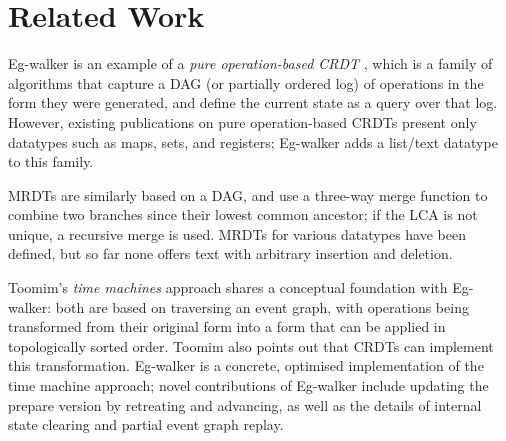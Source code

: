\documentclass[sigplan,10pt]{acmart}
\newcommand{\algname}{Eg-walker\xspace}
\begin{document}



\section{Related Work}\label{related-work}

\algname is an example of a \emph{pure operation-based CRDT} \cite{polog}, which is a family of algorithms that capture a DAG (or partially ordered log) of operations in the form they were generated, and define the current state as a query over that log.
However, existing publications on pure operation-based CRDTs \cite{Almeida2023,Bauwens2023} present only datatypes such as maps, sets, and registers; \algname adds a list/text datatype to this family.

MRDTs \cite{Soundarapandian2022} are similarly based on a DAG, and use a three-way merge function to combine two branches since their lowest common ancestor; if the LCA is not unique, a recursive merge is used.
MRDTs for various datatypes have been defined, but so far none offers text with arbitrary insertion and deletion.

Toomim's \emph{time machines} approach \cite{time-machines} shares a conceptual foundation with \algname: both are based on traversing an event graph, with operations being transformed from their original form into a form that can be applied in topologically sorted order.
Toomim also points out that CRDTs can implement this transformation.
\algname is a concrete, optimised implementation of the time machine approach; novel contributions of \algname include updating the prepare version by retreating and advancing, as well as the details of internal state clearing and partial event graph replay.
\end{document}
